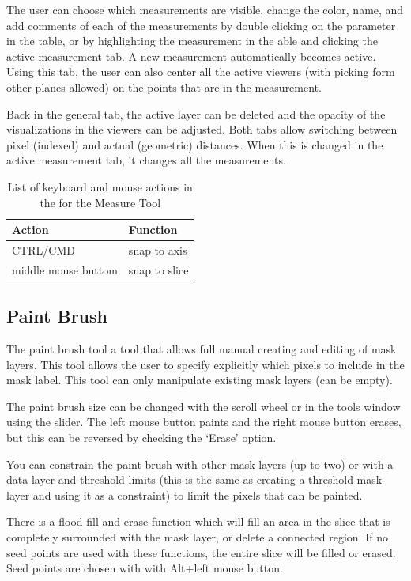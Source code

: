 \documentclass[fleqn,11pt,openany]{book}
\begin{document}
The user can choose which measurements are visible, change the color, name, and add comments of each of the measurements by double clicking on the parameter in the table, or by highlighting the measurement in the able and clicking the active measurement tab.  A new measurement automatically becomes active.  Using this tab, the user can also center all the active viewers (with picking form other planes allowed) on the points that are in the measurement.  

Back in the general tab, the active layer can be deleted and the opacity of the visualizations in the viewers can be adjusted.  Both tabs allow switching between pixel (indexed) and actual (geometric) distances.  When this is changed in the active measurement tab, it changes all the measurements.  

\begin{table}[h!]
\label{tab:measurekey}
\caption{List of keyboard and mouse actions in the for the Measure Tool}
\begin{tabular}{|l|l|}
\hline
{\bf Action} & {\bf Function}\\
\hline
CTRL/CMD & snap to axis\\
\hline
middle mouse buttom & snap to slice\\
\hline
\end{tabular}
\end{table}


\subsection{Paint Brush}

The paint brush tool a tool that allows full manual creating and editing of mask layers.  This tool allows the user to specify explicitly which pixels to include in the mask label.  This tool can only manipulate existing mask layers (can be empty).   

The paint brush size can be changed with the scroll wheel or in the tools window using the slider.   The left mouse button paints and the right mouse button erases, but this can be reversed by checking the `Erase' option.  

You can constrain the paint brush with other mask layers (up to two) or with a data layer and threshold limits (this is the same as creating a threshold mask layer and using it as a constraint) to limit the pixels that can be painted. 

There is a flood fill and erase function which will fill an area in the slice that is completely surrounded with the mask layer, or delete a connected region.  If no seed points are used with these functions, the entire slice will be filled or erased.  Seed points are chosen with with Alt+left mouse button.  
\end{document}
